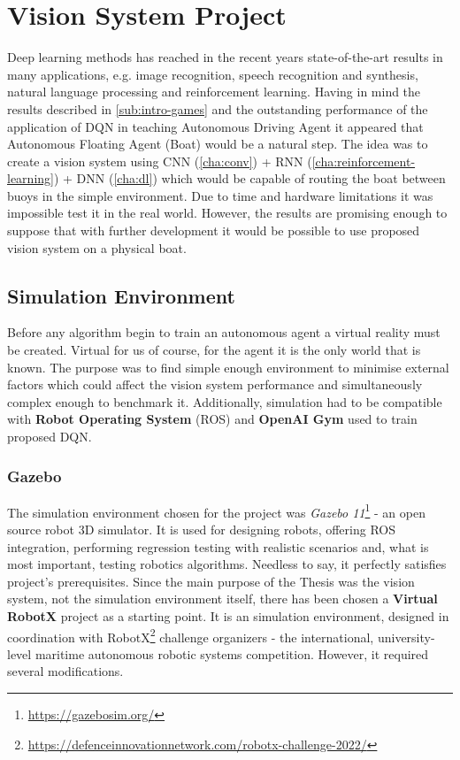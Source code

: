 \chapter{Vision System Project}
\label{cha:vision-system-project}

Deep learning methods has reached in the recent years state-of-the-art results in many applications, e.g. image recognition, speech recognition and synthesis, natural language processing and reinforcement learning. Having in mind the results described in \ref{sub:intro-games} and the outstanding performance of the application of DQN in teaching Autonomous Driving Agent \cite{2020DuckieTown} it appeared that Autonomous Floating Agent (Boat) would be a natural step. The idea was to create a vision system using CNN (\ref{cha:conv}) + RNN (\ref{cha:reinforcement-learning}) + DNN (\ref{cha:dl}) which would be capable of routing the boat between buoys in the simple environment. Due to time and hardware limitations it was impossible test it in the real world. However, the results are promising enough to suppose that with further development it would be possible to use proposed vision system on a physical boat.

\section{Simulation Environment}
\label{sec:simulation-env}

Before any algorithm begin to train an autonomous agent a virtual reality must be created. Virtual for us of course, for the agent it is the only world that is known. The purpose was to find simple enough environment to minimise external factors which could affect the vision system performance and simultaneously complex enough to benchmark it. Additionally, simulation had to be compatible with \textbf{Robot Operating System} (ROS) and \textbf{OpenAI Gym} used to train proposed DQN. 

\subsection{Gazebo}
\label{sub:gazebo}

The simulation environment chosen for the project was \emph{Gazebo 11}\footnote{\url{https://gazebosim.org/}} - an open source robot 3D simulator.
It is used for designing robots, offering ROS integration, performing regression testing with realistic scenarios and, what is most important, testing robotics algorithms. Needless to say, it perfectly satisfies project's prerequisites. Since the main purpose of the Thesis was the vision system, not the simulation environment itself, there has been chosen a \textbf{Virtual RobotX} \cite{bingham19toward} project as a starting point. It is an simulation environment, designed in coordination with RobotX\footnote{\url{https://defenceinnovationnetwork.com/robotx-challenge-2022/}} challenge organizers - the international, university-level maritime autonomous robotic systems competition. However, it required several modifications.

